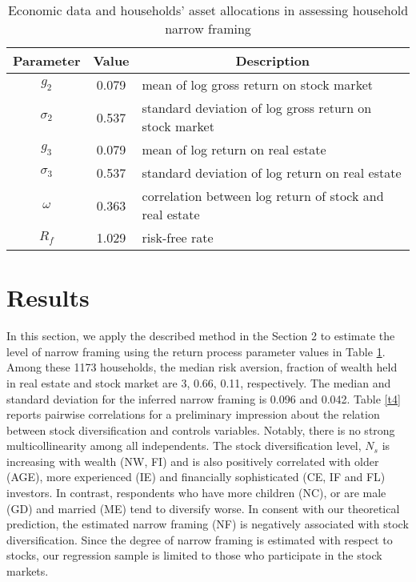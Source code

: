 \documentclass[ukenglish,nottitlepage,thmsb,11pt,letterpaper]{article}
\begin{document}
 
  
 \begin{spacing}{1}
 	\begin{table}[H]
 		\renewcommand\arraystretch{1.25}%
 		\centering
 		\caption{Economic data and households' asset allocations in assessing household narrow framing}
 		\begin{tabular}{ccl}
 			\toprule
 			Parameter   & \multicolumn{1}{c}{Value} & \multicolumn{1}{c}{Description} \\
 			\midrule

 			$g_2$         & 0.079      &   mean of log gross return on stock market \\
 			$\sigma_2$      & 0.537       &   standard deviation of log gross return on stock market \\
			$g_3$         & 0.079      &   mean of log return on real estate \\
			$\sigma_3$      & 0.537       &  standard deviation of log return on real estate \\
 			$\omega$       & 0.363       &  correlation between log return of stock and real estate \\
	        $R_f$       & 1.029       & risk-free rate \\
 			\bottomrule
 		\end{tabular}%
 		\label{table_3}%
 	\end{table}%
 \end{spacing}

\section{Results}

In this section, we apply the described method  in the Section 2 to estimate the level of narrow framing using the return process parameter values in Table \ref{table_3}. Among these 1173 households, the median risk aversion, fraction of wealth held in real estate and stock market are 3, 0.66, 0.11, respectively. The median and standard deviation for the inferred narrow framing is 0.096 and 0.042. Table \ref{t4} reports pairwise correlations for a preliminary impression about the relation between stock diversification and controls variables. Notably, there is no strong multicollinearity among all independents. The stock diversification level, $N_s$ is increasing with wealth (NW, FI) and is also positively correlated with older (AGE), more experienced  (IE) and financially sophisticated (CE, IF and FL) investors.  In contrast, respondents who have more children (NC),  or are male (GD) and married (ME) tend to diversify worse. In consent with our theoretical  prediction, the estimated narrow framing (NF) is negatively associated with stock diversification. Since the degree of narrow framing is estimated with respect to stocks, our regression sample is limited to those who participate in the stock markets.  
\end{document}
